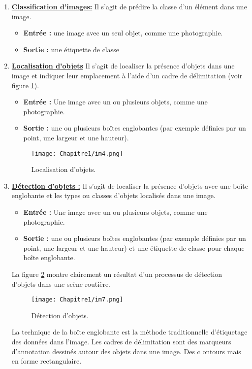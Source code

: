 \begin{enumerate}
\item \underline{\textbf{Classification d'images:}}
Il s'agit de prédire la classe d'un élément dans une image. 
    
\begin{itemize}
\item \textbf{Entrée : }une image avec un seul objet, comme une photographie.
         
\item \textbf{Sortie :} une étiquette de classe 
\end{itemize}

\item \underline{\textbf{Localisation d'objets}}
Il s'agit de localiser la présence d'objets dans une image et indiquer leur emplacement à l'aide d'un cadre de délimitation (voir figure \ref{im4}).
     
\begin{itemize}
\item  \textbf{Entrée :} Une image avec un ou plusieurs objets, comme une photographie.
\item  \textbf{Sortie :} une ou plusieurs boîtes englobantes (par exemple définies par un point, une largeur et une hauteur).
\end{itemize}

\begin{figure}[H]
\centering
\texttt{[image: Chapitre1/im4.png]}
\caption{Localisation d'objets.}
\label{im4}
\end{figure}

\item \underline{\textbf{Détection d'objets :}}
Il s'agit de localiser la présence d'objets avec une boîte englobante et les types ou classes d'objets localisés dans une image. 

\begin{itemize}
\item  \textbf{Entrée : }Une image avec un ou plusieurs objets, comme une photographie.
\item \textbf{Sortie :} une ou plusieurs boîtes englobantes (par exemple définies par un point, une largeur et une hauteur) et une étiquette de classe pour chaque boîte englobante.   
 \end{itemize}
La figure \ref{im7} montre clairement un résultat d'un processus de détection d'objets dans une scène routière.

\begin{figure}[H]
\centering
\texttt{[image: Chapitre1/im7.png]}
\caption {Détection d'objets.}
\label{im7}
\end{figure}
     
La technique de la boîte englobante est la méthode traditionnelle d'étiquetage des données dans l'image. Les cadres de délimitation sont des marqueurs d'annotation dessinés autour des objets dans une image. Des c ontours mais en forme rectangulaire. 
\end{enumerate}

